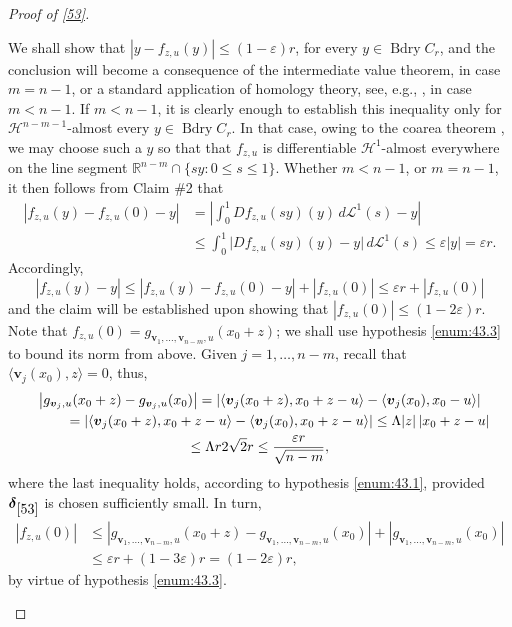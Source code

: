 \documentclass[JEP,XML,SOM,Unicode,ThmDefs,NoEqCountersInSection]{cedram}
\newenvironment{Empty*}[2][\null]{%
\begin{enonce*}[remark]{#1}#2}
{\end{enonce*}}
\newcommand{\R}{\mathbb{R}}
\newcommand{\calH}{\mathscr{H}}
\newcommand{\calL}{\mathscr{L}}
\newcommand{\bdelta}{\boldsymbol{\delta}}
\newcommand{\bv}{{\boldsymbol{v}}}
\DeclareMathOperator{\rmBdry}{\mathrm{Bdry}}
\let\veps\varepsilon
\let\la\langle
\let\ra\rangle
\let\subset\subseteq
\begin{document}
\begin{proof}[Proof of \ref{53}]
\begin{Empty*}[Claim \#3. $C_{\veps r} \subset f_{z,u}(C_r)$]
We shall show that $|y - f_{z,u}(y)| \leq (1-\veps)r$, for every $y \in \rmBdry C_r$, and the conclusion will become a consequence of the intermediate value theorem, in case $m=n-1$, or a standard application of homology theory, see, e.g., \cite[4.6.1]{DEP.05c}, in case $m < n-1$.
If $m < n-1$, it is clearly enough to establish this inequality only for $\calH^{n-m-1}$-almost every $y \in \rmBdry C_r$.
In that case, owing to the coarea theorem \cite[3.2.22]{GMT}, we may choose such a $y$ so that that $f_{z,u}$ is differentiable $\calH^1$-almost everywhere on the line segment $\R^{n-m} \cap \{ sy: 0 \leq s \leq 1 \}$.
Whether $m < n-1$, or $m=n-1$, it then follows from Claim \#2 that
\begin{align*}
\left| f_{z,u}(y) - f_{z,u}(0) - y \right| &= \left| \int_0^1 Df_{z,u}(sy)(y) \,d\calL^1(s) - y \right| \\
&\leq \int_0^1 \bigl| Df_{z,u}(sy)(y)-y\bigr| \,d\calL^1(s) \leq \veps |y| = \veps r.
\end{align*}
Accordingly,
\begin{equation*}
\left|f_{z,u}(y) - y \right| \leq \left| f_{z,u}(y) - f_{z,u}(0) - y \right| + \left| f_{z,u}(0)\right| \leq \veps r + \left| f_{z,u}(0)\right|
\end{equation*}
and the claim will be established upon showing that $\left| f_{z,u}(0)\right| \leq (1- 2 \veps)r$.
Note that $f_{z,u}(0) = g_{\bv_1,\ldots,\bv_{n-m},u}(x_0+z)$; we shall use hypothesis \eqref{enum:43.3} to bound its norm from above.
Given $j=1,\ldots,n-m$, recall that $\la \bv_j(x_0), z \ra = 0$, thus,
\begin{multline*}
\left| g_{\bv_j,u}(x_0+z) - g_{\bv_j,u}(x_0) \right| = \left| \la \bv_j(x_0+z), x_0+z-u \ra - \la \bv_j(x_0), x_0 - u \ra \right| \\
\hspace*{1cm}= \left| \la \bv_j(x_0+z), x_0+z-u \ra - \la \bv_j(x_0), x_0 + z - u \ra \right| \leq \Lambda |z|\, |x_0 + z - u| \\
\leq \Lambda r 2\sqrt{2} r \leq \frac{\veps r}{\sqrt{n-m}},
\end{multline*}
where the last inequality holds, according to hypothesis \eqref{enum:43.1}, provided $\bdelta_{\ref{53}}$ is chosen sufficiently small.
In turn,
\begin{align*}
\left| f_{z,u}(0) \right| &\leq \left| g_{\bv_1,\ldots,\bv_{n-m},u}(x_0+z) - g_{\bv_1,\ldots,\bv_{n-m},u}(x_0) \right| + \left| g_{\bv_1,\ldots,\bv_{n-m},u}(x_0)\right| \\
&\leq \veps r + (1-3\veps)r = (1-2\veps) r,
\end{align*}
by virtue of hypothesis \eqref{enum:43.3}.
\end{Empty*}


\end{proof}
\end{document}

